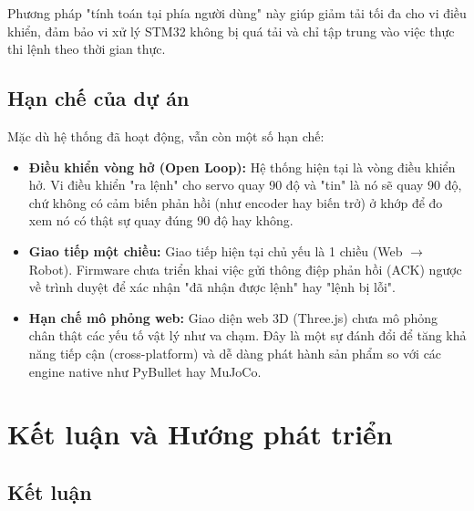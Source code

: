 \documentclass[12pt, a4paper, oneside]{report}
\numberwithin{equation}{chapter} %
\numberwithin{figure}{chapter}   %
\numberwithin{table}{chapter}    %
\begin{document}
Phương pháp "tính toán tại phía người dùng" này giúp giảm tải tối đa cho vi điều khiển, đảm bảo vi xử lý STM32 không bị quá tải và chỉ tập trung vào việc thực thi lệnh theo thời gian thực.

\section{Hạn chế của dự án}

Mặc dù hệ thống đã hoạt động, vẫn còn một số hạn chế:
\begin{itemize}
    \item \textbf{Điều khiển vòng hở (Open Loop):} Hệ thống hiện tại là vòng điều khiển hở. Vi điều khiển "ra lệnh" cho servo quay 90 độ và "tin" là nó sẽ quay 90 độ, chứ không có cảm biến phản hồi (như encoder hay biến trở) ở khớp để đo xem nó có thật sự quay đúng 90 độ hay không.
    \item \textbf{Giao tiếp một chiều:} Giao tiếp hiện tại chủ yếu là 1 chiều (Web $\rightarrow$ Robot). Firmware chưa triển khai việc gửi thông điệp phản hồi (ACK) ngược về trình duyệt để xác nhận "đã nhận được lệnh" hay "lệnh bị lỗi".
    \item \textbf{Hạn chế mô phỏng web:} Giao diện web 3D (Three.js) chưa mô phỏng chân thật các yếu tố vật lý như va chạm. Đây là một sự đánh đổi để tăng khả năng tiếp cận (cross-platform) và dễ dàng phát hành sản phẩm so với các engine native như PyBullet hay MuJoCo.
\end{itemize}

\chapter{Kết luận và Hướng phát triển}

\section{Kết luận}
\end{document}

